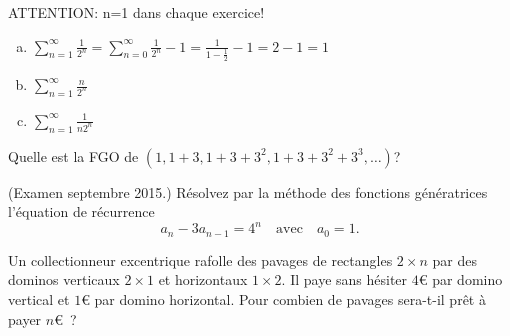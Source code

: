 ATTENTION: n=1 dans chaque exercice!

\begin{enumerate}[a)]
\item $\displaystyle \sum_{n=1}^\infty \frac{1}{2^n} = \sum_{n=0}^\infty \frac{1}{2^n} - 1 = \frac{1}{1-\frac{1}{2}} - 1 = 2 - 1 = 1 $
\item $\displaystyle \sum_{n=1}^\infty \frac{n}{2^n}$
\item $\displaystyle \sum_{n=1}^\infty \frac{1}{n 2^n}$ 
\end{enumerate}


\begin{exo}
Quelle est la FGO de $(1,1+3,1+3+3^2,1+3+3^2+3^3,\ldots)$?
\end{exo}


\begin{exo} (Examen septembre 2015.)
R\'esolvez par la m\'ethode des fonctions g\'en\'eratrices l'\'equation de r\'ecurrence 
\[
a_n-3a_{n-1}=4^n \quad \mathrm{avec} \quad a_0=1.
\]
\end{exo}


\begin{exo}
Un collectionneur excentrique rafolle des pavages de rectangles $2 \times n$ par des dominos verticaux $2 \times 1$ et horizontaux $1 \times 2$. Il paye sans h\'esiter $4$\euro{} par domino vertical et $1$\euro{} par domino horizontal. Pour combien de pavages sera-t-il pr\^et \`a payer $n$\euro~?
\end{exo}


